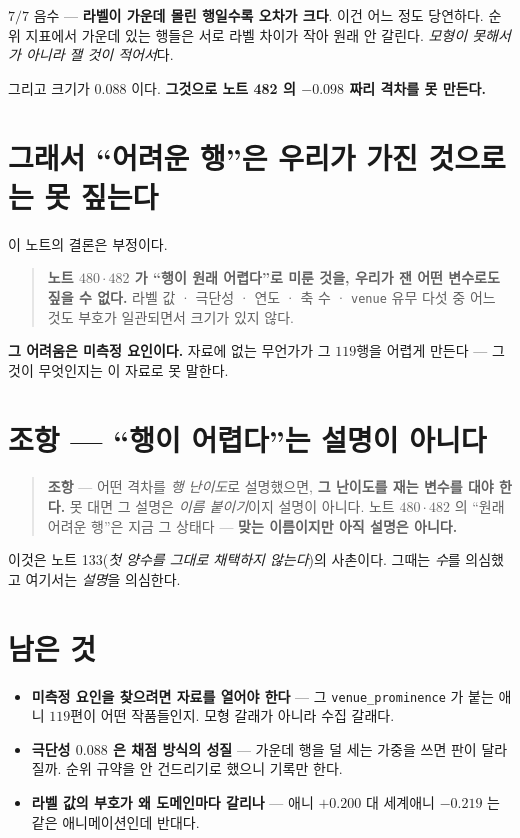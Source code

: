 \documentclass[11pt]{article}
\begin{document}
$7/7$ 음수 --- \textbf{라벨이 가운데 몰린 행일수록 오차가 크다}. 이건
어느 정도 당연하다. 순위 지표에서 가운데 있는 행들은 서로 라벨 차이가
작아 원래 안 갈린다. \emph{모형이 못해서가 아니라 잴 것이 적어서}다.

그리고 크기가 $0.088$ 이다. \textbf{그것으로 노트 482 의 $-0.098$ 짜리
격차를 못 만든다.}

\section{그래서 ``어려운 행''은 우리가 가진 것으로는 못 짚는다}

이 노트의 결론은 부정이다.

\begin{quote}
\textbf{노트 $480 \cdot 482$ 가 ``행이 원래 어렵다''로 미룬 것을, 우리가
잰 어떤 변수로도 짚을 수 없다.} 라벨 값 · 극단성 · 연도 · 축 수 ·
\texttt{venue} 유무 다섯 중 어느 것도 부호가 일관되면서 크기가 있지 않다.
\end{quote}

\textbf{그 어려움은 미측정 요인이다.} 자료에 없는 무언가가 그 $119$행을
어렵게 만든다 --- 그것이 무엇인지는 이 자료로 못 말한다.

\section*{조항 --- ``행이 어렵다''는 설명이 아니다}

\begin{quote}
\textbf{조항} --- 어떤 격차를 \emph{행 난이도}로 설명했으면, \textbf{그
난이도를 재는 변수를 대야 한다.} 못 대면 그 설명은 \emph{이름 붙이기}이지
설명이 아니다. 노트 $480 \cdot 482$ 의 ``원래 어려운 행''은 지금 그
상태다 --- \textbf{맞는 이름이지만 아직 설명은 아니다.}
\end{quote}

이것은 노트 133(\emph{첫 양수를 그대로 채택하지 않는다})의 사촌이다.
그때는 \emph{수}를 의심했고 여기서는 \emph{설명}을 의심한다.

\section*{남은 것}

\begin{itemize}
\item \textbf{미측정 요인을 찾으려면 자료를 열어야 한다} --- 그
\texttt{venue\_prominence} 가 붙는 애니 $119$편이 어떤 작품들인지.
모형 갈래가 아니라 수집 갈래다.
\item \textbf{극단성 $0.088$ 은 채점 방식의 성질} --- 가운데 행을 덜
세는 가중을 쓰면 판이 달라질까. 순위 규약을 안 건드리기로 했으니
기록만 한다.
\item \textbf{라벨 값의 부호가 왜 도메인마다 갈리나} --- 애니 $+0.200$
대 세계애니 $-0.219$ 는 같은 애니메이션인데 반대다.
\end{itemize}
\end{document}

